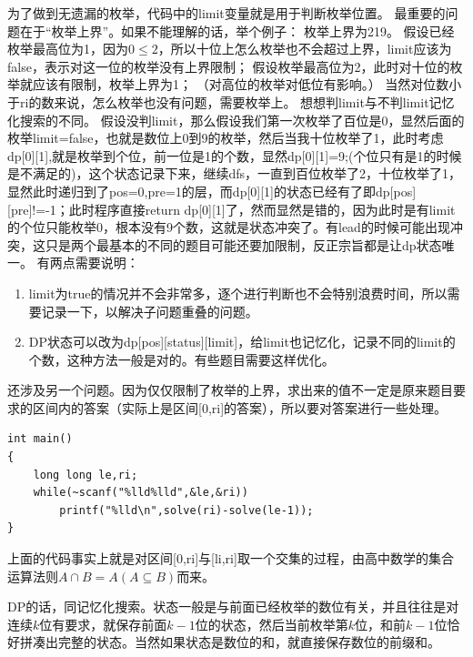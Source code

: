 \documentclass{article}
\theoremstyle{nonumberplain}
\begin{document}
	为了做到无遗漏的枚举，代码中的limit变量就是用于判断枚举位置。
	最重要的问题在于“枚举上界”。如果不能理解的话，举个例子：
	枚举上界为219。
	假设已经枚举最高位为1，因为$0\le 2$，所以十位上怎么枚举也不会超过上界，limit应该为false，表示对这一位的枚举没有上界限制；
	假设枚举最高位为2，此时对十位的枚举就应该有限制，枚举上界为1；
	（对高位的枚举对低位有影响。）
	当然对位数小于ri的数来说，怎么枚举也没有问题，需要枚举上。
	想想判limit与不判limit记忆化搜索的不同。
	假设没判limit，那么假设我们第一次枚举了百位是0，显然后面的枚举limit=false，也就是数位上0到9的枚举，然后当我十位枚举了1，此时考虑dp[0][1],就是枚举到个位，前一位是1的个数，显然dp[0][1]=9;(个位只有是1的时候是不满足的)，这个状态记录下来，继续dfs，一直到百位枚举了2，十位枚举了1，显然此时递归到了pos=0,pre=1的层，而dp[0][1]的状态已经有了即dp[pos][pre]!=-1；此时程序直接return dp[0][1]了，然而显然是错的，因为此时是有limit的个位只能枚举0，根本没有9个数，这就是状态冲突了。有lead的时候可能出现冲突，这只是两个最基本的不同的题目可能还要加限制，反正宗旨都是让dp状态唯一。
	有两点需要说明：
	\begin{enumerate}
		\item{limit为true的情况并不会非常多，逐个进行判断也不会特别浪费时间，所以需要记录一下，以解决子问题重叠的问题。}
		\item{DP状态可以改为dp[pos][status][limit]，给limit也记忆化，记录不同的limit的个数，这种方法一般是对的。有些题目需要这样优化。}
	\end{enumerate}
	还涉及另一个问题。因为仅仅限制了枚举的上界，求出来的值不一定是原来题目要求的区间内的答案（实际上是区间[0,ri]的答案），所以要对答案进行一些处理。
	\begin{verbatim}
int main()  
{  
    long long le,ri;  
    while(~scanf("%lld%lld",&le,&ri))  
        printf("%lld\n",solve(ri)-solve(le-1));  
}  
\end{verbatim}

	上面的代码事实上就是对区间[0,ri]与[li,ri]取一个交集的过程，由高中数学的集合运算法则$A\cap B=A(A\subseteq B)$而来。

	DP的话，同记忆化搜索。状态一般是与前面已经枚举的数位有关，并且往往是对连续$k$位有要求，就保存前面$k-1$位的状态，然后当前枚举第$k$位，和前$k-1$位恰好拼凑出完整的状态。当然如果状态是数位的和，就直接保存数位的前缀和。
\end{document}
